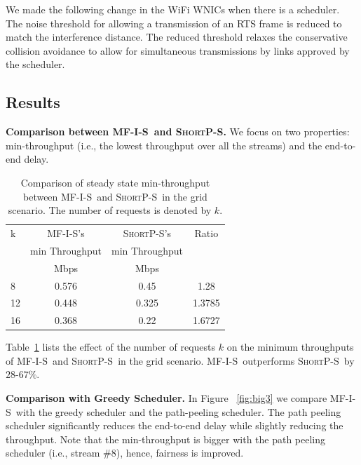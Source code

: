 \documentclass[11pt]{article}
\newenvironment{proof sketch}[1]{\noindent {\emph{Proof sketch of #1:}}}{\hfill \qed}
\newcommand{\algA}{\textsc{MF-I-S}}
\newcommand{\algBS}{\textsc{ShortP-S}}
\begin{document}
We made the following change in the WiFi WNICs when there is a
scheduler. The noise threshold for allowing a transmission of an RTS
frame is reduced to match the interference distance. The reduced
threshold relaxes the conservative collision avoidance to allow for
simultaneous transmissions by links approved by the scheduler.

\subsection{Results}

\medskip
\noindent
\textbf{Comparison between \algA\ and \algBS .}  We focus on two
properties: min-throughput (i.e., the lowest throughput over all the
streams) and the end-to-end delay.
\begin{table}
  \centering \scriptsize
  \begin{tabular}{|| l || c | c | c ||}
    \hline
    k & \algA 's            & \algBS 's & Ratio\\
    &  min Throughput   & min Throughput & \\
    \hline
    & Mbps & Mbps & \\
    \hline\hline
    8 & 0.576 & 0.45  & 1.28  \\
    12 & 0.448 & 0.325 & 1.3785 \\
    16 & 0.368  & 0.22 & 1.6727 \\
    \hline
  \end{tabular}
  \caption{Comparison of steady state min-throughput between \algA\ and \algBS\ in the
    grid scenario.  The number of requests is denoted by $k$. }
  \label{tab:minthroughput}
\end{table}

Table~\ref{tab:minthroughput} lists the effect of the number of
requests $k$ on the minimum throughputs of \algA\ and \algBS\ in the
grid scenario.  \algA\ outperforms \algBS\ by $28$-$67\%$.

\medskip
\noindent
\textbf{Comparison with Greedy Scheduler.}  In Figure%
~\ref{fig:big3} we compare \algA\ with the greedy scheduler and the
path-peeling scheduler.  The path peeling scheduler significantly
reduces the end-to-end delay while slightly reducing the throughput.
Note that the min-throughput is bigger with the path peeling scheduler
(i.e., stream \#8), hence, fairness is improved.
\end{document}

